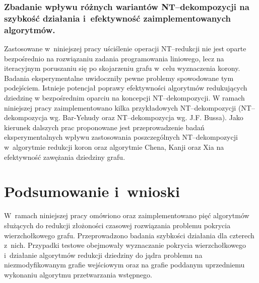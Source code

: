   \subsubsection{\textbf{Zbadanie wpływu różnych wariantów NT--dekompozycji na szybkość działania i~efektywność zaimplementowanych algorytmów.}}

  Zastosowane w~niniejszej pracy uściślenie operacji NT--redukcji nie jest oparte bezpośrednio na rozwiązaniu zadania programowania liniowego, lecz na iteracyjnym poruszaniu się po skojarzeniu grafu w~celu wyznaczenia korony.
  Badania eksperymentalne uwidoczniły pewne problemy spowodowane tym podejściem.
  Istnieje potencjał poprawy efektywności algorytmów redukujących dziedzinę w bezpośrednim oparciu na koncepcji NT--dekompozycji.
  W ramach niniejszej pracy zaimplementowano kilka przykładowych NT--dekompozycji (NT--dekompozycja wg. Bar-Yehudy oraz NT--dekompozycja wg. J.F. Bussa).
  Jako kierunek dalszych prac proponowane jest przeprowadzenie badań eksperymentalnych wpływu zastosowania poszczególnych NT--dekompozycji w~algorytmie redukcji koron oraz algorytmie Chena, Kanji oraz Xia na efektywność zawężania dziedziny grafu.

\section*{Podsumowanie i~wnioski}
\addtocounter{section}{1}
  W~ramach niniejszej pracy omówiono oraz zaimplementowano pięć algorytmów służących do redukcji złożoności czasowej rozwiązania problemu pokrycia wierzchołkowego grafu. Przeprowadzono badania szybkości działania dla czterech z~nich.
  Przypadki testowe obejmowały wyznaczanie pokrycia wierzchołkowego i~działanie algorytmów redukcji dziedziny do jądra problemu na niezmodyfikowanym grafie wejściowym oraz na grafie poddanym uprzedniemu wykonaniu algorytmu przetwarzania wstępnego.

